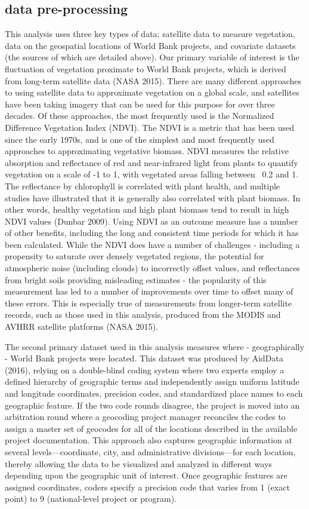     
\subsection{data pre-processing}
  This analysis uses three key types of data: satellite data to measure vegetation, data on the geospatial locations of World Bank projects, and covariate datasets (the sources of which are detailed above). 
Our primary variable of interest is the fluctuation of vegetation proximate to World Bank projects, which is derived from long-term satellite data (NASA 2015). 
There are many different approaches to using satellite data to approximate vegetation on a global scale, and satellites have been taking imagery that can be used for this purpose for over three decades.  
Of these approaches, the most frequently used is the Normalized Difference Vegetation Index (NDVI).  The NDVI is a metric that has been used since the early 1970s, and is one of the simplest and most frequently used approaches to approximating vegetative biomass.  
NDVI measures the relative absorption and reflectance of red and near-infrared light from plants to quantify vegetation on a scale of -1 to 1, with vegetated areas falling between ~0.2 and 1. 
The reflectance by chlorophyll is correlated with plant health, and multiple studies have illustrated that it is generally also correlated with plant biomass. 
In other words, healthy vegetation and high plant biomass tend to result in high NDVI values (Dunbar 2009).  
Using NDVI as an outcome measure has a number of other benefits, including the long and consistent time periods for which it has been calculated.  
While the NDVI does have a number of challenges - including a propensity to saturate over densely vegetated regions, the potential for atmospheric noise (including clouds) to incorrectly offset values, and reflectances from bright soils providing misleading estimates - the popularity of this measurement has led to a number of improvements over time to offset many of these errors.  
This is especially true of measurements from longer-term satellite records, such as those used in this analysis, produced from the MODIS and AVHRR satellite platforms (NASA 2015).
\par
The second primary dataset used in this analysis measures where - geographically - World Bank projects were located.  This dataset was produced by AidData (2016), relying on a double-blind coding system where two experts employ a defined hierarchy of geographic terms and independently assign uniform latitude and longitude coordinates, precision codes, and standardized place names to each geographic feature. If the two code rounds disagree, the project is moved into an arbitration round where a geocoding project manager reconciles the codes to assign a master set of geocodes for all of the locations described in the available project documentation. This approach also captures geographic information at several levels—coordinate, city, and administrative divisions—for each location, thereby allowing the data to be visualized and analyzed in different ways depending upon the geographic unit of interest. Once geographic features are assigned coordinates, coders specify a precision code that varies from 1 (exact point) to 9 (national-level project or program).

